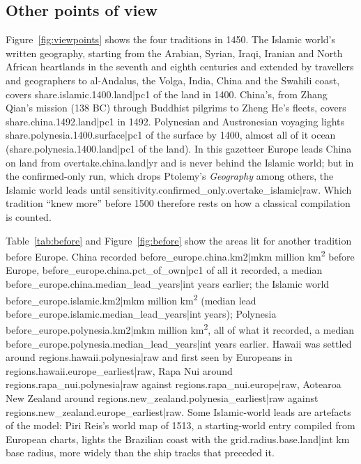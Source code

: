 \documentclass[11pt,a4paper]{article}
\begin{document}
\subsection{Other points of view}
Figure~\ref{fig:viewpoints} shows the four traditions in 1450. The Islamic world's written geography, starting from the Arabian, Syrian, Iraqi, Iranian and North African heartlands in the seventh and eighth centuries and extended by travellers and geographers to al-Andalus, the Volga, India, China and the Swahili coast, covers {{share.islamic.1400.land|pc1}} of the land in 1400. China's, from Zhang Qian's mission (138 BC) through Buddhist pilgrims to Zheng He's fleets, covers {{share.china.1492.land|pc1}} in 1492. Polynesian and Austronesian voyaging lights {{share.polynesia.1400.surface|pc1}} of the surface by 1400, almost all of it ocean ({{share.polynesia.1400.land|pc1}} of the land). In this gazetteer Europe leads China on land from {{overtake.china.land|yr}} and is never behind the Islamic world; but in the confirmed-only run, which drops Ptolemy's \textit{Geography} among others, the Islamic world leads until {{sensitivity.confirmed_only.overtake_islamic|raw}}. Which tradition ``knew more'' before 1500 therefore rests on how a classical compilation is counted.

Table~\ref{tab:before} and Figure~\ref{fig:before} show the areas lit for another tradition before Europe. China recorded {{before_europe.china.km2|mkm}} million km\textsuperscript{2} before Europe, {{before_europe.china.pct_of_own|pc1}} of all it recorded, a median {{before_europe.china.median_lead_years|int}} years earlier; the Islamic world {{before_europe.islamic.km2|mkm}} million km\textsuperscript{2} (median lead {{before_europe.islamic.median_lead_years|int}} years); Polynesia {{before_europe.polynesia.km2|mkm}} million km\textsuperscript{2}, all of what it recorded, a median {{before_europe.polynesia.median_lead_years|int}} years earlier. Hawaii was settled around {{regions.hawaii.polynesia|raw}} and first seen by Europeans in {{regions.hawaii.europe_earliest|raw}}, Rapa Nui around {{regions.rapa_nui.polynesia|raw}} against {{regions.rapa_nui.europe|raw}}, Aotearoa New Zealand around {{regions.new_zealand.polynesia_earliest|raw}} against {{regions.new_zealand.europe_earliest|raw}}. Some Islamic-world leads are artefacts of the model: Piri Reis's world map of 1513, a starting-world entry compiled from European charts, lights the Brazilian coast with the {{grid.radius.base.land|int}} km base radius, more widely than the ship tracks that preceded it.
\end{document}
